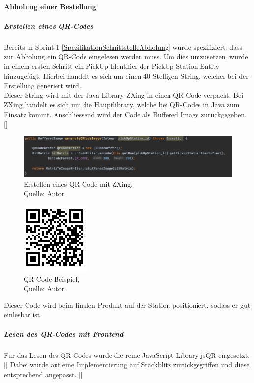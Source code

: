 \paragraph{Abholung einer Bestellung}
\subparagraph{Erstellen eines QR-Codes}
Bereits in Sprint 1 \ref{SpezifikationSchnittstelleAbholung} wurde spezifiziert, dass zur Abholung ein QR-Code eingelesen werden muss. Um dies umzusetzen, wurde in einem ersten Schritt ein PickUp-Identifier der PickUp-Station-Entity hinzugefügt. Hierbei handelt es sich um einen 40-Stelligen String, welcher bei der Erstellung generiert wird. \\
Dieser String wird mit der Java Library ZXing in einen QR-Code verpackt. Bei ZXing handelt es sich um die Hauptlibrary, welche bei QR-Codes in Java zum Einsatz kommt. Anschliessend wird der Code als Buffered Image zurückgegeben. 
[\cite{qrCodeCreation}]
\begin{figure}[H]
	\centering
	\includegraphics[width=1\textwidth]{images/qrCodeCreation.PNG}
	\caption[Erstellen eines QR-Code mit ZXing]{Erstellen eines QR-Code mit ZXing,\\ Quelle: Autor}
	\label{img: qrCodeCreation}
\end{figure} 
\begin{figure}[H]
	\centering
	\includegraphics[scale=0.4]{images/qrCodeExample.PNG}
	\caption[QR-Code Beispiel]{QR-Code Beispiel,\\ Quelle: Autor}
	\label{img: qrCodeExample}
\end{figure} 
Dieser Code wird beim finalen Produkt auf der Station positioniert, sodass er gut einlesbar ist. 

\subparagraph{Lesen des QR-Codes mit Frontend}
Für das Lesen des QR-Codes wurde die reine JavaScript Library jsQR eingesetzt. [\cite{jsQr}]
Dabei wurde auf eine Implementierung auf Stackblitz zurückgegriffen und diese entsprechend angepasst. [\cite{jsQrStackblitz}]\\

